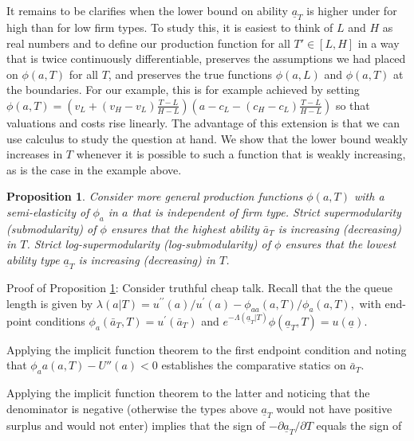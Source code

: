 \documentclass[12pt]{article}
\newtheorem{prop}{Proposition}
\begin{document}
It remains to be clarifies when the lower bound on ability $\underline{a}_T$ is higher under for high than for low firm types. To study this, it is easiest to think of $L$ and $H$ as real numbers and to define our production function for all $T' \in [L,H]$ in a way that is twice continuously differentiable, preserves the assumptions we had placed on $\phi(a,T)$ for all $T$, and preserves the true functions $\phi(a,L)$ and $\phi(a,T)$ at the boundaries. For our example, this is for example achieved by setting $\phi(a,T)=\left(v_L + (v_H - v_L) \frac{T-L}{H-L}\right) \left( a - c_L -  (c_H - c_L) \frac{T-L}{H-L} \right)$ so that valuations and costs rise linearly. The advantage of this extension is that we can use calculus to study the question at hand. We show that the lower bound weakly increases in $T$ whenever it is possible to such a function that is weakly increasing, as is the case in the example above.




\begin{prop}
\label{extension} Consider more general production functions $\phi (a,T)$ with a semi-elasticity of $\phi_a$ in $a$ that is independent of firm type. Strict supermodularity (submodularity) of $\phi$ ensures that the highest ability $\bar{a}_T$ is increasing (decreasing) in $T$. Strict log-supermodularity (log-submodularity) of $\phi $ ensures that the
lowest ability type $\underline{a}_T$ is increasing (decreasing) in $T$.
\end{prop}

\noindent Proof of Proposition \ref{extension}: Consider truthful cheap talk. Recall that the the queue length is given by $\lambda(a|T)=u^{\prime
\prime }(a)/u^{\prime }(a)-\phi _{aa}(a,T)/\phi _{a}(a,T),$ with
end-point conditions $\phi _{a}(\bar{a}_T,T)=u^{\prime }(\bar{a}_{T})$ and $%
e^{-\Lambda (\underline{a}_{T}|T)}\phi(\underline{a}_T,T)=u(\underline{a}%
).$ 

Applying the implicit function theorem to the first endpoint condition and noting that $\phi_aa(a,T)-U''(a)<0$ establishes the comparative statics on $\bar{a}_T$.


Applying the implicit function theorem to the latter and noticing that the denominator is negative (otherwise the types above $\underline{a}_T$ would not have positive surplus and would not enter) implies that the sign of $- \partial \underline{a}_T/\partial T$ equals the sign of
\end{document}
